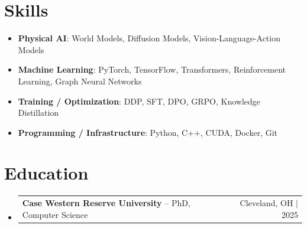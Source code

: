 \documentclass[letterpaper,13pt]{article}
\makeatletter
\newcommand{\resumeProjectHeading}[2]{
    \item
    \begin{tabular*}{\textwidth}{l@{\extracolsep{\fill}}r}
      \small#1 & #2 \\
    \end{tabular*}\vspace{-4pt}
}
\newcommand{\resumeSubHeadingListStart}{\begin{itemize}[leftmargin=0in, label={}]}
\newcommand{\resumeSubHeadingListEnd}{\end{itemize}}
\makeatother
\begin{document}
\section{Skills}
\vspace{0.02cm}
\begin{itemize}[leftmargin=0.15in, label={}, itemsep=2pt, topsep=1pt]
  \item \textbf{Physical AI}: World Models, Diffusion Models, Vision-Language-Action Models
  \item \textbf{Machine Learning}: PyTorch, TensorFlow, Transformers, Reinforcement Learning, Graph Neural Networks
  \item \textbf{Training / Optimization}: DDP, SFT, DPO, GRPO, Knowledge Distillation
  \item \textbf{Programming / Infrastructure}: Python, C++, CUDA, Docker, Git
\end{itemize}
\vspace{0.02cm}

\section{Education}
\resumeSubHeadingListStart
  \resumeProjectHeading{\textbf{Case Western Reserve University} -- PhD, Computer Science}{Cleveland, OH $|$ 2025}
\resumeSubHeadingListEnd
\end{document}

